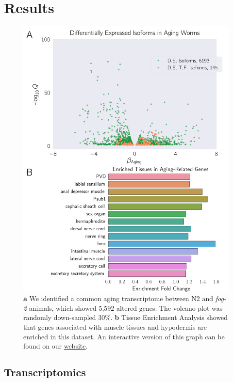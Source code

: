 \documentclass[9pt,twocolumn,twoside]{gsag3jnl}
\newcommand{\fog}{\emph{fog-2}}
\newcommand{\agen}{5,592}
\newcommand{\webref}{\href{https://wormlabcaltech.github.io/Angeles_And_Leighton_2016/}{website}}
\begin{document}
\section{Results}
\label{sec:results}
\begin{figure}[htbp]
\renewcommand{\familydefault}{\sfdefault}\normalfont{}
\centering
\includegraphics[width=\linewidth]{../output/figs/final_figs/aging_transcriptomics.pdf}
\caption{\textbf{ a} We identified a common aging transcriptome between N2 and \fog{} animals, which showed \agen{}  altered genes. The volcano plot was randomly down-sampled 30\%. \textbf{b} Tissue Enrichment Analysis showed that genes associated with muscle tissues and hypodermis are enriched in this dataset. An interactive version of this graph can be found on our \webref{}.
}%
\label{fig:agingtranscriptome}
\end{figure}

\subsection*{Transcriptomics}
\label{sub:Transcriptomics}
\end{document}
